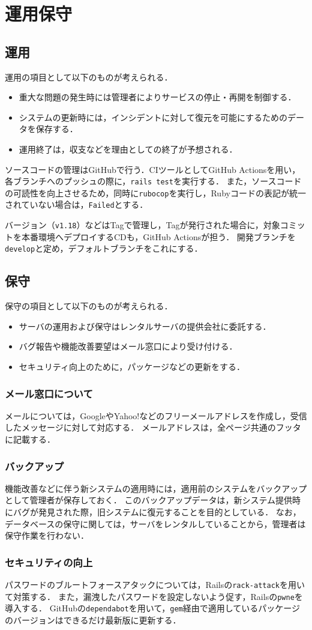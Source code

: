 \chapter{運用保守}
\section{運用}
運用の項目として以下のものが考えられる．
\begin{itemize}
    \item 重大な問題の発生時には管理者によりサービスの停止・再開を制御する．
    \item システムの更新時には，インシデントに対して復元を可能にするためのデータを保存する．
    \item 運用終了は，収支などを理由としての終了が予想される．
\end{itemize}
ソースコードの管理はGitHubで行う．CIツールとしてGitHub Actionsを用い，各ブランチへのプッシュの際に，\texttt{rails test}を実行する．
また，ソースコードの可読性を向上させるため，同時に\texttt{rubocop}を実行し，Rubyコードの表記が統一されていない場合は，\texttt{Failed}とする．\par
バージョン（\texttt{v1.18}）などはTagで管理し，Tagが発行された場合に，対象コミットを本番環境へデプロイするCDも，GitHub Actionsが担う．
開発ブランチを\texttt{develop}と定め，デフォルトブランチをこれにする．
\section{保守}
保守の項目として以下のものが考えられる．
\begin{itemize}
    \item サーバの運用および保守はレンタルサーバの提供会社に委託する．
    \item バグ報告や機能改善要望はメール窓口により受け付ける．
    \item セキュリティ向上のために，パッケージなどの更新をする．
\end{itemize}
\subsection{メール窓口について}
メールについては，GoogleやYahoo!などのフリーメールアドレスを作成し，受信したメッセージに対して対応する．
メールアドレスは，全ページ共通のフッタに記載する．
\subsection{バックアップ}
機能改善などに伴う新システムの適用時には，適用前のシステムをバックアップとして管理者が保存しておく．
このバックアップデータは，新システム提供時にバグが発見された際，旧システムに復元することを目的としている．
なお，データベースの保守に関しては，サーバをレンタルしていることから，管理者は保守作業を行わない．
\subsection{セキュリティの向上}
パスワードのブルートフォースアタックについては，Railsの\texttt{rack-attack}を用いて対策する．
また，漏洩したパスワードを設定しないよう促す，Railsの\texttt{pwne}を導入する．
GitHubの\texttt{dependabot}を用いて，\texttt{gem}経由で適用しているパッケージのバージョンはできるだけ最新版に更新する．